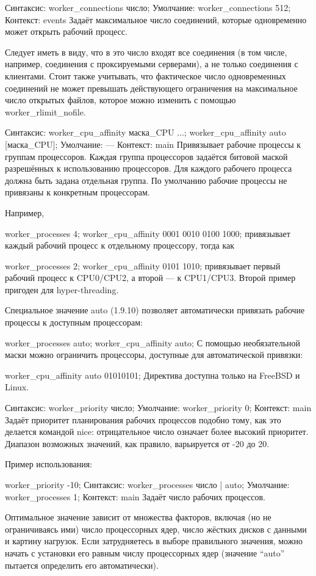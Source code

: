 \documentclass[a4paper,10pt,twoside]{article}
\begin{document}
\begin{itemize}
Синтаксис:	worker_connections число;
Умолчание:	
worker_connections 512;
Контекст:	events
Задаёт максимальное число соединений, которые одновременно может открыть рабочий процесс.

Следует иметь в виду, что в это число входят все соединения (в том числе, например, соединения с проксируемыми серверами), а не только соединения с клиентами. Стоит также учитывать, что фактическое число одновременных соединений не может превышать действующего ограничения на максимальное число открытых файлов, которое можно изменить с помощью worker_rlimit_nofile.

Синтаксис:	worker_cpu_affinity маска_CPU ...;
worker_cpu_affinity auto [маска_CPU];
Умолчание:	—
Контекст:	main
Привязывает рабочие процессы к группам процессоров. Каждая группа процессоров задаётся битовой маской разрешённых к использованию процессоров. Для каждого рабочего процесса должна быть задана отдельная группа. По умолчанию рабочие процессы не привязаны к конкретным процессорам.

Например,

worker_processes    4;
worker_cpu_affinity 0001 0010 0100 1000;
привязывает каждый рабочий процесс к отдельному процессору, тогда как

worker_processes    2;
worker_cpu_affinity 0101 1010;
привязывает первый рабочий процесс к CPU0/CPU2, а второй — к CPU1/CPU3. Второй пример пригоден для hyper-threading.

Специальное значение auto (1.9.10) позволяет автоматически привязать рабочие процессы к доступным процессорам:

worker_processes auto;
worker_cpu_affinity auto;
С помощью необязательной маски можно ограничить процессоры, доступные для автоматической привязки:

worker_cpu_affinity auto 01010101;
Директива доступна только на FreeBSD и Linux.

Синтаксис:	worker_priority число;
Умолчание:	
worker_priority 0;
Контекст:	main
Задаёт приоритет планирования рабочих процессов подобно тому, как это делается командой nice: отрицательное число означает более высокий приоритет. Диапазон возможных значений, как правило, варьируется от -20 до 20.

Пример использования:

worker_priority -10;
Синтаксис:	worker_processes число | auto;
Умолчание:	
worker_processes 1;
Контекст:	main
Задаёт число рабочих процессов.

Оптимальное значение зависит от множества факторов, включая (но не ограничиваясь ими) число процессорных ядер, число жёстких дисков с данными и картину нагрузок. Если затрудняетесь в выборе правильного значения, можно начать с установки его равным числу процессорных ядер (значение “auto” пытается определить его автоматически).


\end{itemize}
\end{document}
